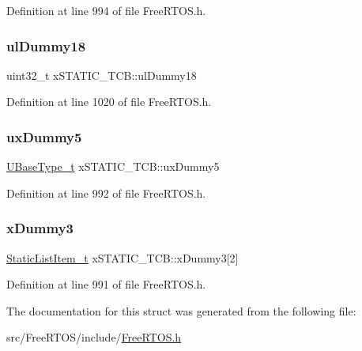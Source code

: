 Definition at line 994 of file Free\+R\+T\+O\+S.\+h.

\mbox{\label{structx_s_t_a_t_i_c___t_c_b_ade6781276f913dcd592ee0f6cce76c7e}} 
\subsubsection{\texorpdfstring{ul\+Dummy18}{ulDummy18}}
{\footnotesize\ttfamily uint32\+\_\+t x\+S\+T\+A\+T\+I\+C\+\_\+\+T\+C\+B\+::ul\+Dummy18}



Definition at line 1020 of file Free\+R\+T\+O\+S.\+h.

\mbox{\label{structx_s_t_a_t_i_c___t_c_b_ab950bb498901ef7291e49086e5a2efd0}} 
\subsubsection{\texorpdfstring{ux\+Dummy5}{uxDummy5}}
{\footnotesize\ttfamily \hyperlink{portmacro_8h_a646f89d4298e4f5afd522202b11cb2e6}{U\+Base\+Type\+\_\+t} x\+S\+T\+A\+T\+I\+C\+\_\+\+T\+C\+B\+::ux\+Dummy5}



Definition at line 992 of file Free\+R\+T\+O\+S.\+h.

\mbox{\label{structx_s_t_a_t_i_c___t_c_b_a7f182aa8f5003494f63d975dabcb3ec1}} 
\subsubsection{\texorpdfstring{x\+Dummy3}{xDummy3}}
{\footnotesize\ttfamily \hyperlink{_free_r_t_o_s_8h_a1d31bc0472385a87424518da484d9e09}{Static\+List\+Item\+\_\+t} x\+S\+T\+A\+T\+I\+C\+\_\+\+T\+C\+B\+::x\+Dummy3\mbox{[}2\mbox{]}}



Definition at line 991 of file Free\+R\+T\+O\+S.\+h.



The documentation for this struct was generated from the following file\+:\begin{DoxyCompactItemize}
\item 
src/\+Free\+R\+T\+O\+S/include/\hyperlink{_free_r_t_o_s_8h}{Free\+R\+T\+O\+S.\+h}\end{DoxyCompactItemize}
